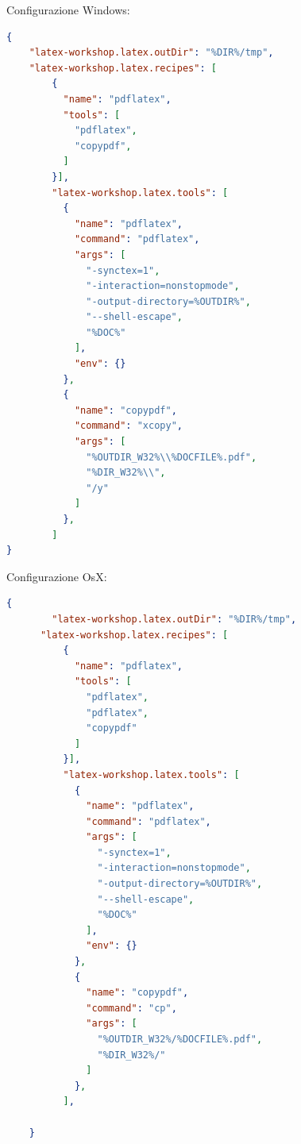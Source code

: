 \documentclass[a4paper]{article}
\begin{document}
Configurazione Windows:

\begin{lstlisting}[language=json]
    {
    "latex-workshop.latex.outDir": "%DIR%/tmp",
    "latex-workshop.latex.recipes": [
        {
          "name": "pdflatex",
          "tools": [
            "pdflatex",
            "copypdf",
          ]
        }],
        "latex-workshop.latex.tools": [
          {
            "name": "pdflatex",
            "command": "pdflatex",
            "args": [
              "-synctex=1",
              "-interaction=nonstopmode",
              "-output-directory=%OUTDIR%",
              "--shell-escape",
              "%DOC%"
            ],
            "env": {}
          },
          {
            "name": "copypdf",
            "command": "xcopy",
            "args": [
              "%OUTDIR_W32%\\%DOCFILE%.pdf",
              "%DIR_W32%\\",
              "/y"
            ]
          },
        ]
}
\end{lstlisting}


Configurazione OsX:

\begin{lstlisting}[language=json]
    {
        "latex-workshop.latex.outDir": "%DIR%/tmp",
      "latex-workshop.latex.recipes": [
          {
            "name": "pdflatex",
            "tools": [
              "pdflatex",
              "pdflatex",
              "copypdf"
            ]
          }],
          "latex-workshop.latex.tools": [
            {
              "name": "pdflatex",
              "command": "pdflatex",
              "args": [
                "-synctex=1",
                "-interaction=nonstopmode",
                "-output-directory=%OUTDIR%",
                "--shell-escape",
                "%DOC%"
              ],
              "env": {}
            },
            {
              "name": "copypdf",
              "command": "cp",
              "args": [
                "%OUTDIR_W32%/%DOCFILE%.pdf",
                "%DIR_W32%/"
              ]
            },
          ],
        
    }
\end{lstlisting}
\end{document}
